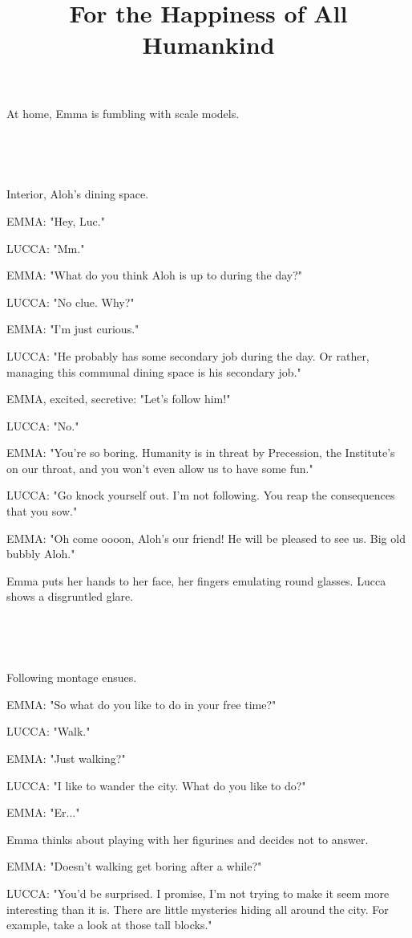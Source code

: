 \documentclass[11pt]{article}
\begin{document}
\ttfamily
\title{For the Happiness of All Humankind}
\maketitle

At home, Emma is fumbling with scale models.

\ 

\ 

Interior, Aloh's dining space.

EMMA: "Hey, Luc."

LUCCA: "Mm."

EMMA: "What do you think Aloh is up to during the day?"

LUCCA: "No clue. Why?"

EMMA: "I'm just curious."

LUCCA: "He probably has some secondary job during the day.
Or rather, managing this communal dining space is his secondary job."

EMMA, excited, secretive: "Let's follow him!"

LUCCA: "No."

EMMA: "You're so boring.
Humanity is in threat by Precession, the Institute's on our throat, and you won't even allow us to have some fun."

LUCCA: "Go knock yourself out. 
I'm not following.
You reap the consequences that you sow."

EMMA: "Oh come oooon, Aloh's our friend!
He will be pleased to see us.
Big old bubbly Aloh."

Emma puts her hands to her face, her fingers emulating round glasses.
Lucca shows a disgruntled glare.

\ 

\ 

Following montage ensues.

EMMA: "So what do you like to do in your free time?"

LUCCA: "Walk."

EMMA: "Just walking?"

LUCCA: "I like to wander the city.
What do you like to do?"

EMMA: "Er..."

Emma thinks about playing with her figurines and decides not to answer.

EMMA: "Doesn't walking get boring after a while?"

LUCCA: "You'd be surprised.
I promise, I'm not trying to make it seem more interesting than it is.
There are little mysteries hiding all around the city.
For example, take a look at those tall blocks."
\end{document}
